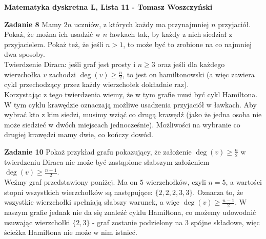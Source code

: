 \documentclass[a4paper,12pt]{article}
\begin{document}
\noindent \textbf{Matematyka dyskretna L, Lista 11 - Tomasz Woszczyński}\newline

\noindent \newline \textbf{Zadanie 8} \newline
Mamy $2n$ uczniów, z których każdy ma przynajmniej $n$ przyjaciół. Pokaż, że można ich
usadzić w $n$ ławkach tak, by każdy z nich siedział z przyjacielem. Pokaż też, że jeśli
$n > 1$, to może być to zrobione na co najmniej dwa sposoby. \\

\noindent Twierdzenie Diraca: jeśli graf jest prosty i $n \geq 3$ oraz jeśli dla każdego
wierzchołka $v$ zachodzi $\deg(v) \geq \frac{n}{2}$, to jest on hamiltonowski (a więc
zawiera cykl przechodzący przez każdy wierzchołek dokładnie raz). \\

\noindent Korzystając z tego twierdzenia wiemy, że w tym grafie musi być cykl Hamiltona.
W tym cyklu krawędzie oznaczają możliwe usadzenia przyjaciół w ławkach. Aby wybrać kto
z kim siedzi, musimy wziąć co drugą krawędź (jako że jedna osoba nie może siedzieć
w dwóch miejscach jednocześnie). Możliwości na wybranie co drugiej krawędzi mamy dwie,
co kończy dowód.

\noindent \newline \textbf{Zadanie 10} \newline
Pokaż przykład grafu pokazujący, że założenie $\deg(v) \geq \frac{n}{2}$ w twierdzeniu
Diraca nie może być zastąpione słabszym założeniem $\deg(v) \geq \frac{n-1}{2}$. \\

\noindent Weźmy graf przedstawiony poniżej. Ma on $5$ wierzchołków, czyli $n = 5$, a 
wartości stopni wszystkich wierzchołków są następujące: $\{ 2, 2, 2, 3, 3 \}$. Oznacza 
to, że wszystkie wierzchołki spełniają słabszy warunek, a więc $\deg(v) \geq 
\frac{n-1}{2}$. W naszym grafie jednak nie da się znaleźć cyklu Hamiltona, co możemy 
udowodnić usuwając wierzchołki $\{ 2, 3 \}$ - graf zostanie podzielony na $3$ spójne 
składowe, więc ścieżka Hamiltona nie może w nim istnieć.

\begin{figure}[h]
    \centering
\end{figure}
\end{document}
